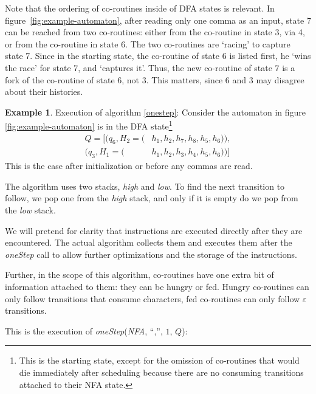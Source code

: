 \documentclass[english,twocolumn]{article}
\theoremstyle{definition}
\newtheorem{example}{Example}[section]
\newcommand{\Figref}[1]{figure~\ref{fig:#1}}
\begin{document}
Note that the ordering of co-routines inside of DFA states is relevant.
In \Figref{example-automaton}, after reading only one comma as an
input, state 7 can be reached from two co-routines: either from the
co-routine in state 3, via 4, or from the co-routine in state 6. The two
co-routines are `racing' to capture state 7. Since in the starting
state, the co-routine of state 6 is listed first, he `wins the race'
for state 7, and `captures it'. Thus, the new co-routine of state 7 is
a fork of the co-routine of state 6, not 3. This matters, since 6 and
3 may disagree about their histories.

\begin{example} Execution of algorithm \ref{onestep}: \label{ex:oneStep1}
Consider the automaton in figure \ref{fig:example-automaton} is in
the DFA state\footnote{This is the starting state, except for the omission of co-routines 
that would die immediately after scheduling because there are no consuming
transitions attached to their NFA state.}
\begin{align*}
Q=[
	(q_6, H_2=(&h_1, h_2, h_7,  h_8, h_5, h_6)), \\
	(q_3, H_1=(&h_1, h_2, h_3,  h_4, h_5, h_6))]
	\end{align*}
This is the case after initialization or before any commas are read.

The algorithm uses two stacks, \emph{high} and \emph{low}.
To find the next transition to follow, we pop one from the \emph{high} stack,
and only if it is empty do we pop from the \emph{low} stack.

We will pretend for clarity that instructions are executed directly
after they are encountered.  The actual algorithm collects them and
executes them after the \emph{oneStep} call to allow further
optimizations and the storage of the instructions.

Further, in the scope of this algorithm, co-routines have one extra bit of information attached to them:
they can be hungry or fed. Hungry co-routines can only follow transitions that consume characters,
fed co-routines can only follow $\varepsilon$ transitions.

This is the execution of \emph{oneStep}(\emph{NFA},
``,'', $1$, $Q$):


\end{example}
\end{document}
